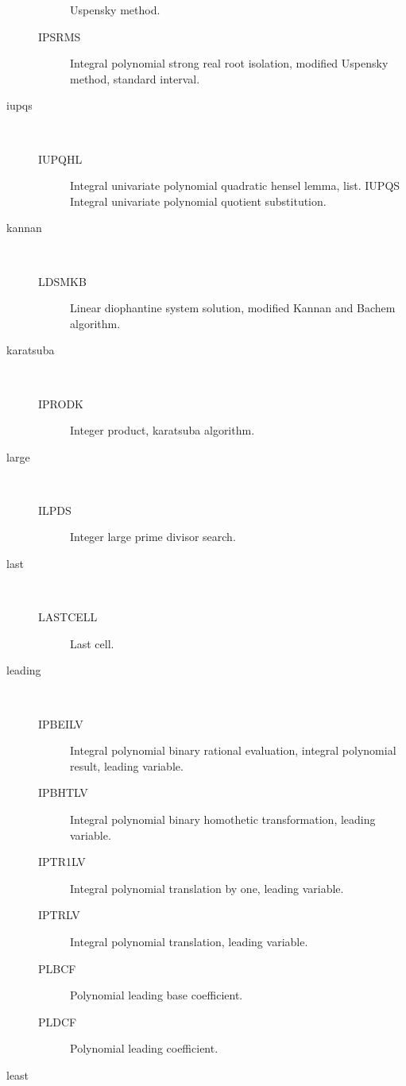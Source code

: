 \begin{description}
\begin{description}
    Uspensky method.
  \item[IPSRMS]  Integral polynomial strong real root isolation, modified
    Uspensky method, standard interval.
  \end{description}
\item[iupqs] \ \ 
  \begin{description}
  \item[IUPQHL]  Integral univariate polynomial quadratic hensel lemma, list.
    IUPQS Integral univariate polynomial quotient substitution.
  \end{description}
\item[kannan] \ \ 
  \begin{description}
  \item[LDSMKB]  Linear diophantine system solution, modified Kannan and
    Bachem algorithm.
  \end{description}
\item[karatsuba] \ \ 
  \begin{description}
  \item[IPRODK]  Integer product, karatsuba algorithm.
  \end{description}
\item[large] \ \ 
  \begin{description}
  \item[ILPDS]  Integer large prime divisor search.
  \end{description}
\item[last] \ \ 
  \begin{description}
  \item[LASTCELL]  Last cell.
  \end{description}
\item[leading] \ \ 
  \begin{description}
  \item[IPBEILV]  Integral polynomial binary rational evaluation, integral
    polynomial result, leading variable.
  \item[IPBHTLV]  Integral polynomial binary homothetic transformation,
    leading variable.
  \item[IPTR1LV]  Integral polynomial translation by one, leading variable.
  \item[IPTRLV]  Integral polynomial translation, leading variable.
  \item[PLBCF]  Polynomial leading base coefficient.
  \item[PLDCF]  Polynomial leading coefficient.
  \end{description}
\item[least] \ \ 

\end{description}
